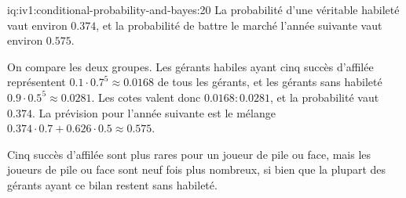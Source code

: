 \begin{solution}{iq:iv1:conditional-probability-and-bayes:20}
La probabilité d'une véritable habileté vaut environ $0.374$, et la probabilité de battre le marché l'année suivante vaut environ $0.575$.

On compare les deux groupes. Les gérants habiles ayant cinq succès d'affilée représentent $0.1 \cdot 0.7^5 \approx 0.0168$ de tous les gérants, et les gérants sans habileté $0.9 \cdot 0.5^5 \approx 0.0281$. Les cotes valent donc $0.0168 : 0.0281$, et la probabilité vaut $0.374$. La prévision pour l'année suivante est le mélange $0.374 \cdot 0.7 + 0.626 \cdot 0.5 \approx 0.575$.

Cinq succès d'affilée sont plus rares pour un joueur de pile ou face, mais les joueurs de pile ou face sont neuf fois plus nombreux, si bien que la plupart des gérants ayant ce bilan restent sans habileté.

\end{solution}

